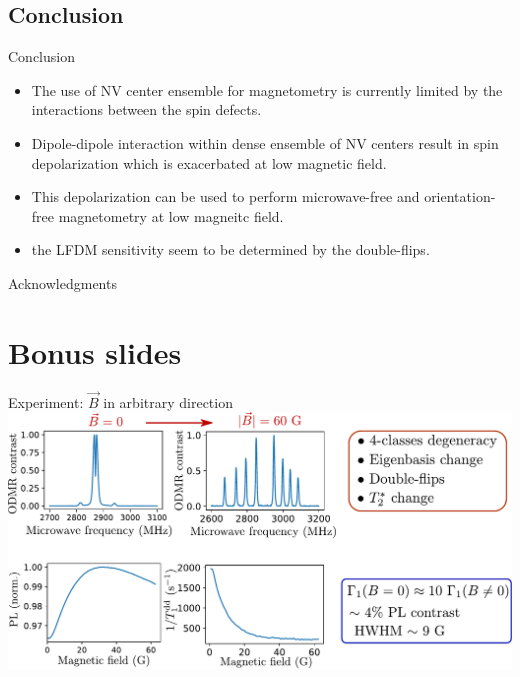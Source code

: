 \documentclass{beamer}
\begin{document}
\subsection{Conclusion}
\begin{frame}{Conclusion}

\begin{itemize}
\item The use of NV center ensemble for magnetometry is currently limited by the interactions between the spin defects.
\bigskip
\item Dipole-dipole interaction within dense ensemble of NV centers result in spin depolarization which is exacerbated at low magnetic field.
\bigskip
\item This depolarization can be used to perform microwave-free and orientation-free magnetometry at low magneitc field.
\bigskip
\item the LFDM sensitivity seem to be determined by the double-flips.
\end{itemize}

\end{frame}

\begin{frame}{Acknowledgments}

\end{frame}

\section*{Bonus slides}

\begin{frame}{Experiment: $\vec B$ in arbitrary direction}
\centering
\includegraphics[width=\textwidth,height=0.85\textheight,keepaspectratio]{Slide_T1_PL_1x1x1x1}
\end{frame}
\end{document}
